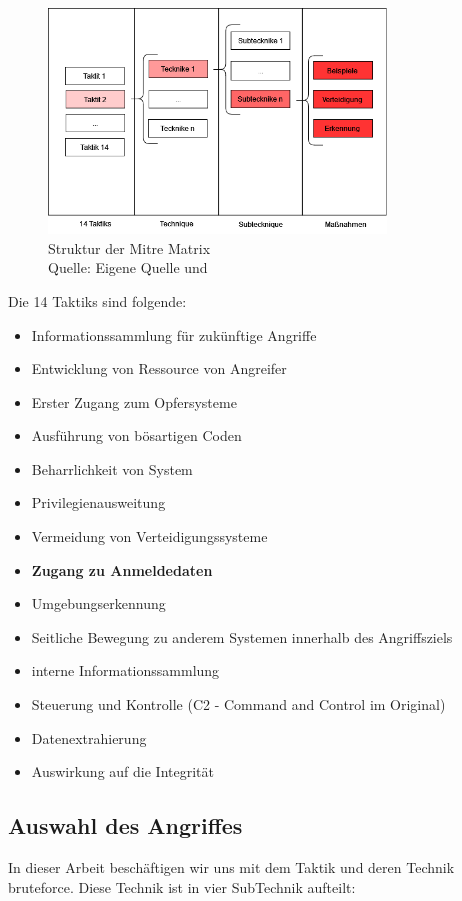 \begin{figure}[H]
   \centering
   \includegraphics[width=0.8\textwidth]{assets/Mitre_structure.drawio.png}
   \caption{Struktur der Mitre Matrix \\Quelle: Eigene Quelle und \citep{Mitre_Started}}
   \centering
\end{figure}

{
Die 14 Taktiks sind folgende:
\begin{itemize}[noitemsep]
   \item Informationssammlung für zukünftige Angriffe 
   \item	Entwicklung von Ressource von Angreifer
   \item Erster Zugang zum Opfersysteme 
   \item Ausführung von bösartigen Coden
   \item Beharrlichkeit von System
   \item	Privilegienausweitung
   \item Vermeidung von Verteidigungssysteme
   \item \textbf{Zugang zu Anmeldedaten}
   \item Umgebungserkennung
   \item Seitliche Bewegung zu anderem Systemen innerhalb des Angriffsziels
   \item interne Informationssammlung
   \item Steuerung und Kontrolle (C2 - Command and Control im Original)
   \item Datenextrahierung 
   \item	Auswirkung auf die Integrität
\end{itemize}
}

\subsection{Auswahl des Angriffes}
In dieser Arbeit beschäftigen wir uns mit dem Taktik  und deren Technik \gls{bruteforce}. Diese Technik ist in vier SubTechnik aufteilt:

